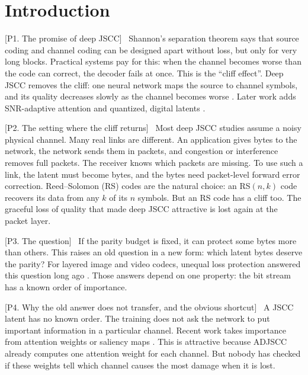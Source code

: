 \documentclass[journal]{IEEEtran}
\newcommand{\beat}[1]{\noindent\textcolor{blue!60!black}{\textsf{\footnotesize [#1]}}\ }
\begin{document}
\section{Introduction}

\beat{P1. The promise of deep JSCC}
Shannon's separation theorem says that source coding and channel coding can be designed apart without
loss, but only for very long blocks. Practical systems pay for this: when the channel becomes worse than
the code can correct, the decoder fails at once. This is the ``cliff effect''. Deep JSCC removes the cliff:
one neural network maps the source to channel symbols, and its quality decreases slowly as the channel
becomes worse \cite{bourtsoulatze2019deep}. Later work adds SNR-adaptive attention \cite{xu2022adjscc}
and quantized, digital latents \cite{tung2022deepjsccq}.

\beat{P2. The setting where the cliff returns}
Most deep JSCC studies assume a noisy physical channel. Many real links are different. An application
gives bytes to the network, the network sends them in packets, and congestion or interference removes
full packets. The receiver knows which packets are missing. To use such a link, the latent must become
bytes, and the bytes need packet-level forward error correction. Reed--Solomon (RS) codes are the natural
choice: an RS$(n,k)$ code recovers its data from any $k$ of its $n$ symbols. But an RS code has a cliff
too. The graceful loss of quality that made deep JSCC attractive is lost again at the packet layer.

\beat{P3. The question}
If the parity budget is fixed, it can protect some bytes more than others. This raises an old question
in a new form: which latent bytes deserve the parity? For layered image and video codecs, unequal loss
protection answered this question long ago \cite{albanese1996pet,mohr2000ulp,dumitrescu2004optimal}.
Those answers depend on one property: the bit stream has a known order of importance.

\beat{P4. Why the old answer does not transfer, and the obvious shortcut}
A JSCC latent has no known order. The training does not ask the network to put important information
in a particular channel. Recent work takes importance from attention weights or saliency maps
\cite{uyanik2023gradfec,zhan2026isfr}. This is attractive because ADJSCC already computes one attention
weight for each channel. But nobody has checked if these weights tell which channel causes the most
damage when it is lost.
\end{document}
